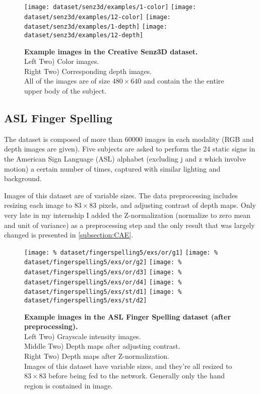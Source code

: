 \begin{figure}[H]
  \centering
  \hfill
  \texttt{[image: dataset/senz3d/examples/1-color]}
  \hfill
  \texttt{[image: dataset/senz3d/examples/12-color]}
  \hfill
  \texttt{[image: dataset/senz3d/examples/1-depth]}
  \hfill
  \texttt{[image: dataset/senz3d/examples/12-depth]}
  \caption{%
    \textbf{Example images in the Creative Senz3D dataset.}\\[0.1em]
    Left Two) Color images.\\[0.1em]
    Right Two) Corresponding depth images.\\[0.1em]
    All of the images are of size $480 \times 640$ and contain the
      the entire upper body of the subject.}
  \label{fig:senz3d_exs}
\end{figure}

\subsection{ASL Finger Spelling}

The dataset is composed of more than 60000 images in each modality
(RGB and depth images are given).
Five subjects are asked to perform the 24 static signs in
the American Sign Language (ASL) alphabet (excluding j and z which involve
motion) a certain number of times, captured with similar lighting
and background.

Images of this dataset are of variable sizes. The data preprocessing
includes resizing each image to $83 \times 83$ pixels, and adjusting
contrast of depth maps. Only very late in my internship I added the
Z-normalization (normalize to zero mean and unit of variance)
as a preprocessing step and the only result that was largely changed
is presented in \ref{subsection:CAE}.

\begin{figure}[H]
  \centering
  \hfill
  \texttt{[image: \%
    dataset/fingerspelling5/exs/or/g1]}
  \hfill
  \texttt{[image: \%
    dataset/fingerspelling5/exs/or/g2]}
  \hfill
  \texttt{[image: \%
    dataset/fingerspelling5/exs/or/d3]}
  \hfill
  \texttt{[image: \%
    dataset/fingerspelling5/exs/or/d4]}
  \hfill
  \texttt{[image: \%
    dataset/fingerspelling5/exs/st/d1]}
  \hfill
  \texttt{[image: \%
    dataset/fingerspelling5/exs/st/d2]}
  \caption{%
    \textbf{Example images in the ASL Finger Spelling dataset
      (after preprocessing).}\\[0.1em]
    Left Two) Grayscale intensity images.\\[0.1em]
    Middle Two) Depth maps after adjusting contrast.\\[0.1em]
    Right Two) Depth maps after Z-normalization.\\[0.1em]
    Images of this dataset have variable sizes, and they're all resized to
      $83 \times 83$ before being fed to the network. Generally only the
      hand region is contained in image.}
  \label{fig:fingerspelling_exs}
\end{figure}

